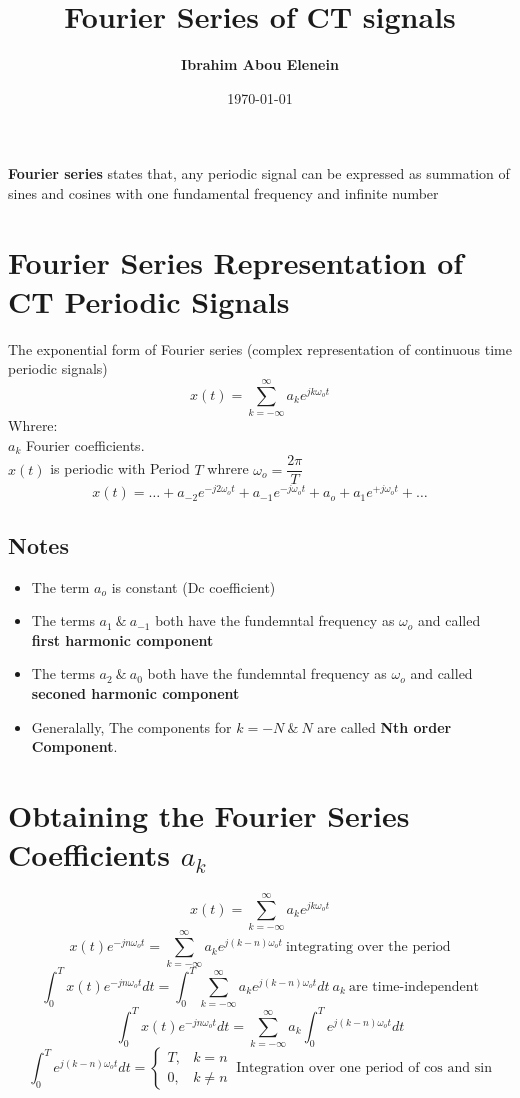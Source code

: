 \documentclass[11pt,a4paper]{article}
\theoremstyle{definition}
\begin{document}
\author{\textbf{Ibrahim Abou Elenein}}
\title{\textbf{Fourier Series of CT signals}}
\date {\today}
\maketitle

\textbf{Fourier series} states that, any periodic signal can 
be expressed as summation of sines and cosines 
with one fundamental frequency and infinite number

\section{Fourier Series Representation of CT Periodic Signals}
The exponential form of Fourier series (complex 
representation of continuous time periodic signals) 
\[
    \displaystyle  x(t) = \sum_{k=-\infty}^{\infty} a_k 
    e^{jk\omega_ot}
\]
Whrere: \\
$a_k$ Fourier coefficients.\\
$x(t)$ is periodic with Period $T$ whrere $\omega_o 
= \dfrac{2\pi}{T}$
\[
    x(t) = \dots + a_{-2}e^{-j2\omega_ot}
    + a_{-1}e^{-j\omega_ot} + a_o + a_{1}e^{+j\omega_ot} + \dots
\]

\subsection{Notes}
\begin{itemize}
    \item The term $a_o$ is constant (Dc coefficient)
    \item The terms $a_1  \ \& \  a_{-1}$ both have the fundemntal frequency
        as $\omega_o$ and called \textbf{first harmonic component}
    \item The terms $a_2  \ \& \  a_{0}$ both have the fundemntal frequency
        as $\omega_o$ and called \textbf{seconed harmonic component}
    \item Generalally, The components for $k=-N \ \& \ N$ are called 
        \textbf{Nth order Component}.

\end{itemize}
\section{Obtaining the Fourier Series Coefficients $a_k$}
\[
    \displaystyle x(t) = \sum_{k=-\infty}^{\infty} a_k e^{jk\omega_ot} 
\]
\[
    \displaystyle x(t)e^{-jn\omega_ot} = \sum_{k=-\infty}^{\infty} a_k e^{j(k-n)\omega_ot} \
    \text{integrating over the period}
\]
\[
    \displaystyle \int_0^T x(t)e^{-jn\omega_ot} dt =
    \int_0^T\sum_{k=-\infty}^{\infty} a_k e^{j(k-n)\omega_ot} dt \   a_k 
    \ \text{are time-independent}
\]
\[
    \displaystyle \int_0^T x(t)e^{-jn\omega_ot} dt =
    \sum_{k=-\infty}^{\infty} a_k \int_0^T e^{j(k-n)\omega_ot} dt 
\]
\[
    \displaystyle  \int_0^T e^{j(k-n)\omega_ot} dt = 
    \begin{cases}
        T, & k =n \\
        0, & k \neq n
    \end{cases} \ \text{Integration over one period of cos and sin}
\]
\end{document}

